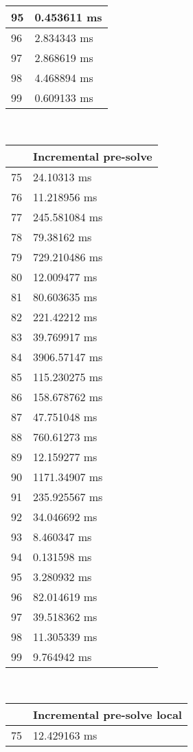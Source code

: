 \begin{multicols}{2}
\begin{tabular}{|l|l|}
		95 & 0.453611 ms \\ \hline
		96 & 2.834343 ms \\ \hline
		97 & 2.868619 ms \\ \hline
		98 & 4.468894 ms \\ \hline
		99 & 0.609133 ms \\ \hline
	\end{tabular}\\
	\begin{tabular}{|l|l|}
		\hline
		& Incremental pre-solve \\ \hline
		75 & 24.10313 ms \\ \hline
		76 & 11.218956 ms \\ \hline
		77 & 245.581084 ms \\ \hline
		78 & 79.38162 ms \\ \hline
		79 & 729.210486 ms \\ \hline
		80 & 12.009477 ms \\ \hline
		81 & 80.603635 ms \\ \hline
		82 & 221.42212 ms \\ \hline
		83 & 39.769917 ms \\ \hline
		84 & 3906.57147 ms \\ \hline
		85 & 115.230275 ms \\ \hline
		86 & 158.678762 ms \\ \hline
		87 & 47.751048 ms \\ \hline
		88 & 760.61273 ms \\ \hline
		89 & 12.159277 ms \\ \hline
		90 & 1171.34907 ms \\ \hline
		91 & 235.925567 ms \\ \hline
		92 & 34.046692 ms \\ \hline
		93 & 8.460347 ms \\ \hline
		94 & 0.131598 ms \\ \hline
		95 & 3.280932 ms \\ \hline
		96 & 82.014619 ms \\ \hline
		97 & 39.518362 ms \\ \hline
		98 & 11.305339 ms \\ \hline
		99 & 9.764942 ms \\ \hline
	\end{tabular}\\
	\begin{tabular}{|l|l|}
		\hline
		& Incremental pre-solve local \\ \hline
		75 & 12.429163 ms \\ \hline

\end{tabular}
\end{multicols}
